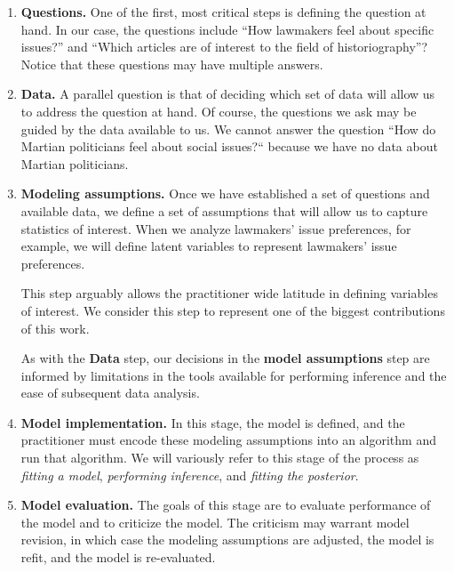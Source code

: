 \begin{enumerate}
  \item \textbf{Questions.} One of the first, most critical steps is
    defining the question at hand.  In our case, the questions include
    ``How lawmakers feel about specific issues?'' and ``Which articles
    are of interest to the field of historiography''? Notice that
    these questions may have multiple answers.

  \item \textbf{Data.} A parallel question is that of deciding which
    set of data will allow us to address the question at hand.  Of
    course, the questions we ask may be guided by the data available
    to us.  We cannot answer the question ``How do Martian politicians
    feel about social issues?`` because we have no data about
    Martian politicians.

  \item \textbf{Modeling assumptions.} Once we have established a set
    of questions and available data, we define a set of assumptions
    that will allow us to capture statistics of interest.  When we
    analyze lawmakers' issue preferences, for example, we will define
    latent variables to represent lawmakers' issue preferences.

    This step arguably allows the practitioner wide latitude in
    defining variables of interest.  We consider this step to
    represent one of the biggest contributions of this work.

    As with the \textbf{Data} step, our decisions in the \textbf{model
      assumptions} step are informed by limitations in the
    tools available for performing inference and the ease of
    subsequent data analysis.

  \item \textbf{Model implementation.} In this stage, the model is
    defined, and the practitioner must encode these modeling
    assumptions into an algorithm and run that algorithm.  We will
    variously refer to this stage of the process as \emph{fitting a
      model}, \emph{performing inference}, and \emph{fitting the
      posterior}.

  \item \textbf{Model evaluation.} The goals of this stage are to
    evaluate performance of the model and to criticize the model.
    The criticism may warrant model revision, in which case the
    modeling assumptions are adjusted, the model is refit, and the
    model is re-evaluated.


\end{enumerate}
